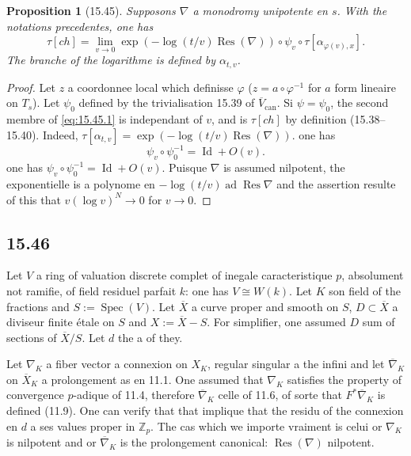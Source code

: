 \documentclass[12pt,a4paper]{article}
\theoremstyle{plain}
\newtheorem{proposition}[theorem]{Proposition}
\theoremstyle{definition}
\theoremstyle{remark}
\DeclareMathOperator{\Spec}{Spec}
\DeclareMathOperator{\Res}{Res}
\DeclareMathOperator{\ad}{ad}
\newcommand{\Id}{\operatorname{Id}}
\newcommand{\bZ}{\mathbb{Z}}
\begin{document}
\begin{proposition}[15.45]
Supposons $\nabla$ a monodromy unipotente en $s$. With the notations precedentes, one has
\begin{equation}\label{eq:15.45.1}
\tau[ch] = \lim_{v \to 0} \exp(-\log(t/v) \Res(\nabla)) \circ \psi_v \circ \tau[\alpha_{\varphi(v), x}].
\end{equation}
The branche of the logarithme is defined by $\alpha_{t,v}$.
\end{proposition}

\begin{proof}
Let $z$ a coordonnee local which definisse $\varphi$ ($z = a \circ \varphi^{-1}$ for $a$ form lineaire on $T_s$). Let $\psi_0$ defined by the trivialisation 15.39 of $\overline{V}_{\text{can}}$. Si $\psi = \psi_0$, the second membre of \eqref{eq:15.45.1} is independant of $v$, and is $\tau[ch]$ by definition (15.38--15.40). Indeed, $\tau[\alpha_{t,v}] = \exp(-\log(t/v) \Res(\nabla))$. one has
\[
\psi_v \circ \psi_0^{-1} = \Id + O(v).
\]
one has $\psi_v \circ \psi_0^{-1} = \Id + O(v)$. Puisque $\nabla$ is assumed nilpotent, the exponentielle is a polynome en $-\log(t/v) \ad \Res \nabla$ and the assertion resulte of this that $v(\log v)^N \to 0$ for $v \to 0$.
\end{proof}

\subsection*{15.46}

Let $V$ a ring of valuation discrete complet of inegale caracteristique $p$, absolument not ramifie, of field residuel parfait $k$: one has $V \cong W(k)$. Let $K$ son field of the fractions and $S := \Spec(V)$. Let $\overline{X}$ a curve proper and smooth on $S$, $D \subset \overline{X}$ a diviseur finite étale on $S$ and $X := \overline{X} - S$. For simplifier, one assumed $D$ sum of sections of $\overline{X}/S$. Let $d$ the a of they.

Let $\nabla_K$ a fiber vector a connexion on $X_K$, regular singular a the infini and let $\overline{\nabla}_K$ on $\overline{X}_K$ a prolongement as en 11.1. One assumed that $\nabla_K$ satisfies the property of convergence $p$-adique of 11.4, therefore $\overline{\nabla}_K$ celle of 11.6, of sorte that $F^* \overline{\nabla}_K$ is defined (11.9). One can verify that that implique that the residu of the connexion en $d$ a ses values proper in $\bZ_p$. The cas which we importe vraiment is celui or $\nabla_K$ is nilpotent and or $\overline{\nabla}_K$ is the prolongement canonical: $\Res(\nabla)$ nilpotent.
\end{document}
